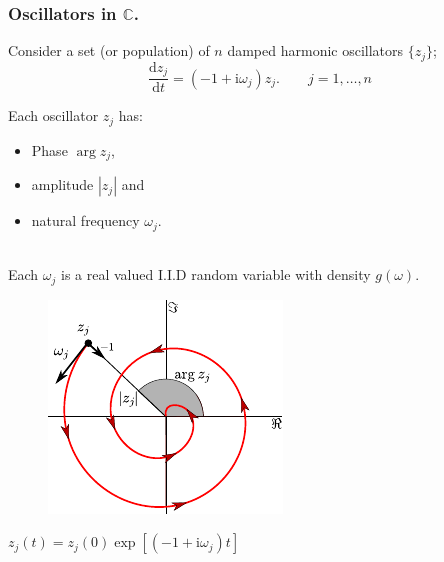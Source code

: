 \documentclass[10pt,reqno]{beamer}
\newcommand{\D}[2]{\frac{\mathrm{d} #1}{\mathrm{d} #2}}
\newcommand{\I}{\mathrm{i}}
\renewcommand{\mod}[1]{\left|#1\right|}
\newcommand{\complex}{\mathbb{C}}
\begin{document}
\begin{frame}[t]
\frametitle{Oscillators in $\complex$.} 
Consider a set (or population) of $n$ damped harmonic oscillators $\{z_j\}$;
\[
\D{z_j}{t} =(-1+\I\omega_j)z_j. \qquad j=1,\ldots,n
\] 
\begin{minipage}{0.49\textwidth}
Each oscillator $z_j$ has:
\begin{itemize}
\item Phase $\arg{z_j}$,
\item amplitude $\mod{z_j}$ and 
\item natural frequency $\omega_j$.
\end{itemize}
~\\
Each $\omega_j$ is a real valued I.I.D random variable with density $g(\omega)$.
\end{minipage}
\begin{minipage}{0.49\textwidth}
\begin{figure}
\includegraphics[scale = 0.95]{dosc}
\end{figure}
\centering
$z_j(t) = z_j(0)\exp[(-1+\I\omega_j)t]$
\end{minipage}
\end{frame}
\end{document}
